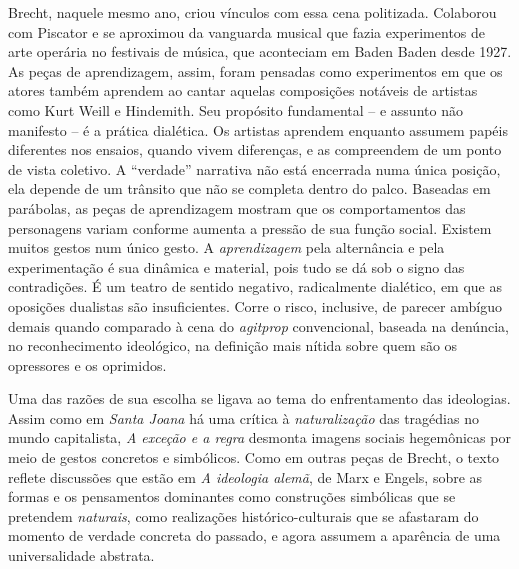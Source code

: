 Brecht, naquele mesmo ano, criou vínculos com essa cena politizada.
Colaborou com Piscator e se aproximou da vanguarda musical que fazia
experimentos de arte operária no festivais de música, que aconteciam em
Baden Baden desde 1927. As peças de aprendizagem, assim, foram
pensadas como experimentos em que os atores também aprendem ao cantar
aquelas composições notáveis de artistas como Kurt Weill e Hindemith.
Seu propósito fundamental -- e assunto não manifesto -- é a prática
dialética. Os artistas aprendem enquanto assumem papéis diferentes nos
ensaios, quando vivem diferenças, e as compreendem de um ponto de vista
coletivo. A “verdade” narrativa não está encerrada numa única posição,
ela depende de um trânsito que não se completa dentro do palco. Baseadas
em parábolas, as peças de aprendizagem mostram que os
comportamentos das personagens variam conforme aumenta a pressão de sua
função social. Existem muitos gestos num único gesto. A
{\it aprendizagem} pela alternância e pela experimentação é sua dinâmica
e material, pois tudo se dá sob o signo das contradições. É um teatro de
sentido negativo, radicalmente dialético, em que as oposições dualistas
são insuficientes. Corre o risco, inclusive, de parecer ambíguo demais
quando comparado à cena do {\it agitprop} convencional, baseada na
denúncia, no reconhecimento ideológico, na definição mais nítida sobre
quem são os opressores e os oprimidos.

\subject{Estudo da peça: A exceção e a regra}


Uma das razões de sua escolha se ligava ao tema do enfrentamento das
ideologias. Assim como em {\it Santa Joana} há uma crítica à
{\it naturalização} das tragédias no mundo capitalista, {\it A exceção e
a regra} desmonta imagens sociais hegemônicas por meio de gestos
concretos e simbólicos. Como em outras peças de Brecht, o texto reflete
discussões que estão em {\it A ideologia alemã}, de Marx e Engels, sobre
as formas e os pensamentos dominantes como construções simbólicas que se
pretendem {\it naturais}, como realizações histórico-culturais que se
afastaram do momento de verdade concreta do passado, e agora assumem a
aparência de uma universalidade abstrata.

